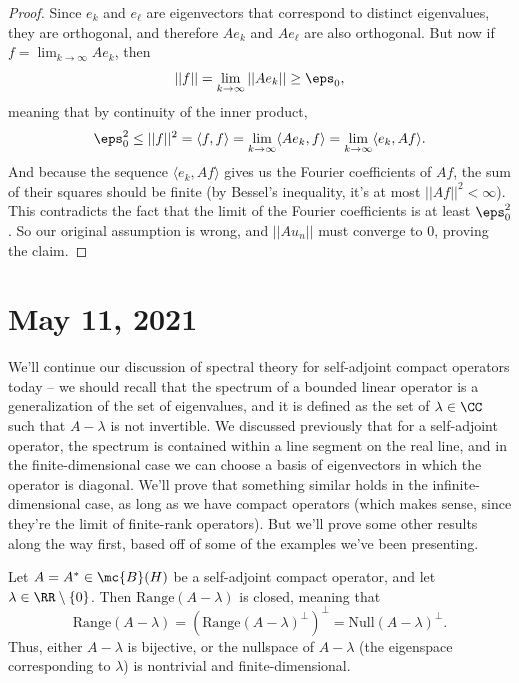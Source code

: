 \begin{proof}
Since $e_k$ and $e_\ell$ are eigenvectors that correspond to distinct eigenvalues, they are orthogonal, and therefore $Ae_k$ and $Ae_\ell$ are also orthogonal. But now if $f = \lim_{k \to \infty} Ae_k$, then 
\[
    ||f|| = \lim_{k \to \infty} ||Ae_k|| \ge \eps_0,
\]
meaning that by continuity of the inner product,
\[
    \eps_0^2 \le ||f||^2 = \langle f, f \rangle = \lim_{k \to \infty} \langle Ae_k, f \rangle = \lim_{k \to \infty} \langle e_k, Af \rangle.
\]
And because the sequence $\langle e_k, Af \rangle$ gives us the Fourier coefficients of $Af$, the sum of their squares should be finite (by Bessel's inequality, it's at most $||Af||^2 < \infty$). This contradicts the fact that the limit of the Fourier coefficients is at least $\eps_0^2$. So our original assumption is wrong, and $||Au_n||$ must converge to $0$, proving the claim.
\end{proof}


\pagebreak\section*{May 11, 2021}

We'll continue our discussion of spectral theory for self-adjoint compact operators today -- we should recall that the spectrum of a bounded linear operator is a generalization of the set of eigenvalues, and it is defined as the set of $\lambda \in \CC$ such that $A - \lambda$ is not invertible. We discussed previously that for a self-adjoint operator, the spectrum is contained within a line segment on the real line, and in the finite-dimensional case we can choose a basis of eigenvectors in which the operator is diagonal. We'll prove that something similar holds in the infinite-dimensional case, as long as we have compact operators (which makes sense, since they're the limit of finite-rank operators). But we'll prove some other results along the way first, based off of some of the examples we've been presenting.

\begin{theorem}
Let $A = A^\ast \in \mc{B}(H)$ be a self-adjoint compact operator, and let $\lambda \in \RR \setminus \{0\}$. Then $\text{Range}(A - \lambda)$ is closed, meaning that
\[
    \text{Range}(A - \lambda) = (\text{Range}(A-\lambda)^\perp)^\perp = \text{Null}(A - \lambda)^\perp.
\]
Thus, either $A - \lambda$ is bijective, or the nullspace of $A - \lambda$ (the eigenspace corresponding to $\lambda$) is nontrivial and finite-dimensional.
\end{theorem}

